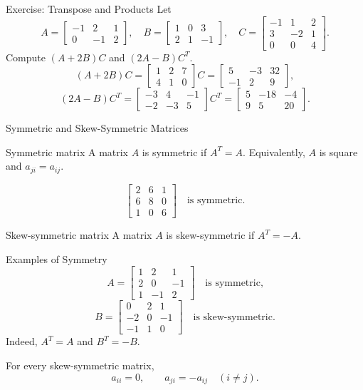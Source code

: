 \begin{frame}[shrink=9]{Exercise: Transpose and Products}
Let
\[
A=\begin{bmatrix}-1&2&1\\0&-1&2\end{bmatrix},\quad
B=\begin{bmatrix}1&0&3\\2&1&-1\end{bmatrix},\quad
C=\begin{bmatrix}-1&1&2\\3&-2&1\\0&0&4\end{bmatrix}.
\]
Compute $(A+2B)C$ and $(2A-B)C^T$.
\[
(A+2B)C=
\begin{bmatrix}1&2&7\\4&1&0\end{bmatrix}C
=\begin{bmatrix}5&-3&32\\-1&2&9\end{bmatrix},
\]
\[
(2A-B)C^T=
\begin{bmatrix}-3&4&-1\\-2&-3&5\end{bmatrix}C^T
=\begin{bmatrix}5&-18&-4\\9&5&20\end{bmatrix}.
\]
\end{frame}

\begin{frame}{Symmetric and Skew-Symmetric Matrices}
\begin{block}{Symmetric matrix}
A matrix $A$ is symmetric if $A^T=A$. Equivalently, $A$ is square and $a_{ji}=a_{ij}$.
\end{block}
\[
\begin{bmatrix}2&6&1\\6&8&0\\1&0&6\end{bmatrix}
\quad\text{is symmetric.}
\]
\begin{block}{Skew-symmetric matrix}
A matrix $A$ is skew-symmetric if $A^T=-A$.
\end{block}
\end{frame}

\begin{frame}{Examples of Symmetry}
\[
A=\begin{bmatrix}1&2&1\\2&0&-1\\1&-1&2\end{bmatrix}
\quad\text{is symmetric,}
\]
\[
B=\begin{bmatrix}0&2&1\\-2&0&-1\\-1&1&0\end{bmatrix}
\quad\text{is skew-symmetric.}
\]
Indeed, $A^T=A$ and $B^T=-B$.
\medskip

For every skew-symmetric matrix,
\[
a_{ii}=0,\qquad a_{ji}=-a_{ij}\quad(i\ne j).
\]
\end{frame}

